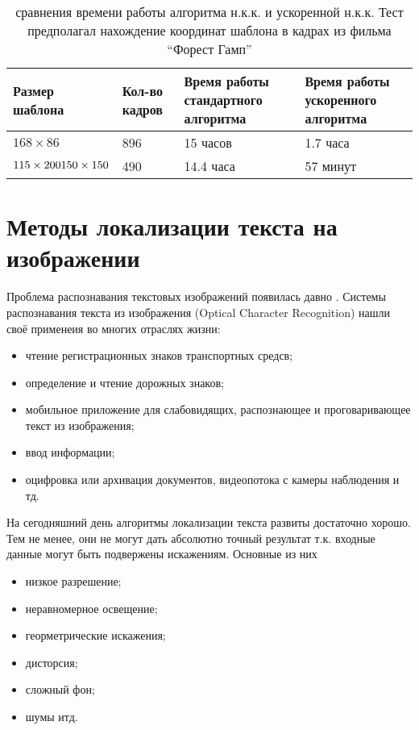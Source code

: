 \documentclass[oneside,final,14pt]{extreport}
\begin{document}
\begin{table}[H]
\caption{
сравнения времени работы алгоритма н.к.к.  и ускоренной н.к.к. Тест предполагал нахождение координат шаблона в кадрах из фильма “Форест Гамп”
}
\begin{tabularx}{\textwidth}{|X|X|X|X|}
\hline
Размер шаблона
&
Кол-во кадров
&
Время работы стандартного алгоритма
&
Время работы ускоренного алгоритма
\\
\hline
$168 \times 86$ & 896 & 15 часов & 1.7 часа 
\\
\hline
$	 115\times 200 \newline 150 \times 150 $
 & 490  &14.4 часа & 57 минут 
\\
\hline
\end{tabularx}
\end{table}

\chapter{Методы локализации текста на изображении}
Проблема распознавания текстовых изображений появилась давно \cite{JDAR_survey}. Системы распознавания текста из изображения (Optical Character Recognition) нашли своё применеия во многих отраслях жизни:

\begin{itemize}
\item чтение регистрационных знаков транспортных средсв;
\item определение и чтение дорожных знаков;

\item мобильное приложение для слабовидящих, распознающее и проговаривающее текст из изображения;

\item ввод информации;

\item оцифровка или архивация документов, видеопотока с камеры наблюдения и тд.

\end{itemize}

На сегодняшний день алгоритмы локализации текста развиты достаточно хорошо. Тем не менее, они не могут дать абсолютно точный результат т.к. входные данные могут быть подвержены искажениям. Основные из них

\begin{itemize}
\item низкое разрешение; 


\item неравномерное освещение;

\item георметрические искажения;

\item дисторсия;

\item сложный фон;

\item шумы итд.

\end{itemize}
\end{document}
